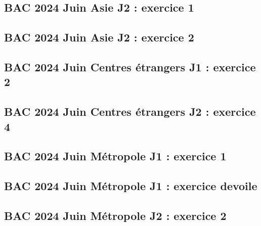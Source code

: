 \documentclass[lang=fr,edition=teacher,layout=sheet]{mxbook}
\begin{document}
\begingroup\endgroup
\par\bigskip
{}\subsection*{BAC 2024 Juin Asie J2 : exercice 1}
\begingroup\endgroup
\par\bigskip
{}\subsection*{BAC 2024 Juin Asie J2 : exercice 2}
\begingroup\endgroup
\par\bigskip
{}\subsection*{BAC 2024 Juin Centres étrangers J1 : exercice 2}
\begingroup\endgroup
\par\bigskip
{}\subsection*{BAC 2024 Juin Centres étrangers J2 : exercice 4}
\begingroup\endgroup
\par\bigskip
{}\subsection*{BAC 2024 Juin Métropole J1 : exercice 1}
\begingroup\endgroup
\par\bigskip
{}\subsection*{BAC 2024 Juin Métropole J1 : exercice devoile}
\begingroup\endgroup
\par\bigskip
{}\subsection*{BAC 2024 Juin Métropole J2 : exercice 2}
\end{document}
